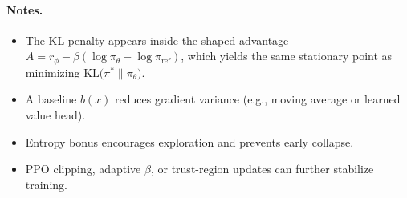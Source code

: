 \documentclass[11pt]{article}
\newcommand{\KL}{\mathrm{KL}}
\theoremstyle{remark}
\begin{document}
\paragraph{Notes.}
\begin{itemize}[leftmargin=*]
    \item The KL penalty appears inside the shaped advantage
    $A = r_\phi - \beta(\log \pi_\theta - \log \pi_{\text{ref}})$,
    which yields the same stationary point as minimizing
    $\KL\!\big(\pi^* \| \pi_\theta\big)$.
    \item A baseline $b(x)$ reduces gradient variance (e.g., moving average or learned value head).
    \item Entropy bonus encourages exploration and prevents early collapse.
    \item PPO clipping, adaptive $\beta$, or trust-region updates can further stabilize training.
\end{itemize}
\end{document}
